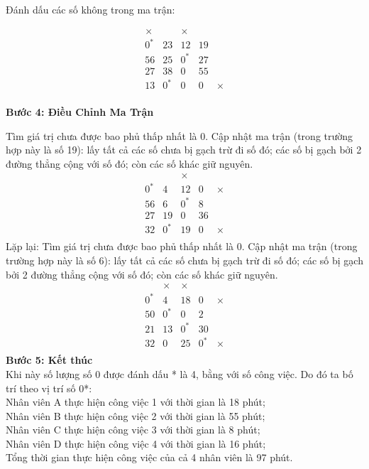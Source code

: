 Đánh dấu các số không trong ma trận:

\[
\begin{array}{ccccc}
\times    & &\times & & \\
0^* & 23 & 12 & 19 & \\
56 & 25 & 0^* & 27 & \\
27 & 38 & 0 & 55 & \\
13 & 0^* & 0 & 0 & \times\\
\end{array}
\]

\textbf{Bước 4: Điều Chỉnh Ma Trận}

Tìm giá trị chưa được bao phủ thấp nhất là 0. Cập nhật ma trận (trong trường hợp này là số 19): lấy tất cả các số chưa bị gạch trừ đi số đó; các số bị gạch bởi 2 đường thẳng cộng với số đó; còn các số khác giữ nguyên.
\[
\begin{array}{ccccc}
    & &\times & & \\
0^* & 4 & 12 & 0 & \times\\
56 & 6 & 0^* & 8 & \\
27 & 19 & 0 & 36 & \\
32 & 0^* & 19 & 0 & \times\\
\end{array}
\]
Lặp lại: Tìm giá trị chưa được bao phủ thấp nhất là 0.
Cập nhật ma trận (trong trường hợp này là số 6):
lấy tất cả các số chưa bị gạch trừ đi số đó; các số bị gạch bởi 2 đường thẳng cộng với số đó;
còn các số khác giữ nguyên.
\[
\begin{array}{ccccc}
    & \times&\times & & \\
0^* & 4 & 18 & 0 & \times\\
50 & 0^* & 0 & 2 & \\
21 & 13 & 0^* & 30 & \\
32 & 0 & 25 & 0^* & \times\\
\end{array}
\]
\textbf{Bước 5: Kết thúc}\\
Khi này số lượng số 0 được đánh dấu * là 4, bằng với số công việc.
Do đó ta bố trí theo vị trí số 0*:\\
Nhân viên A thực hiện công việc 1 với thời gian là 18 phút;\\
Nhân viên B thực hiện công việc 2 với thời gian là 55 phút;\\
Nhân viên C thực hiện công việc 3 với thời gian là 8 phút;\\
Nhân viên D thực hiện công việc 4 với thời gian là 16 phút;\\
Tổng thời gian thực hiện công việc của cả 4 nhân viên là 97 phút.


